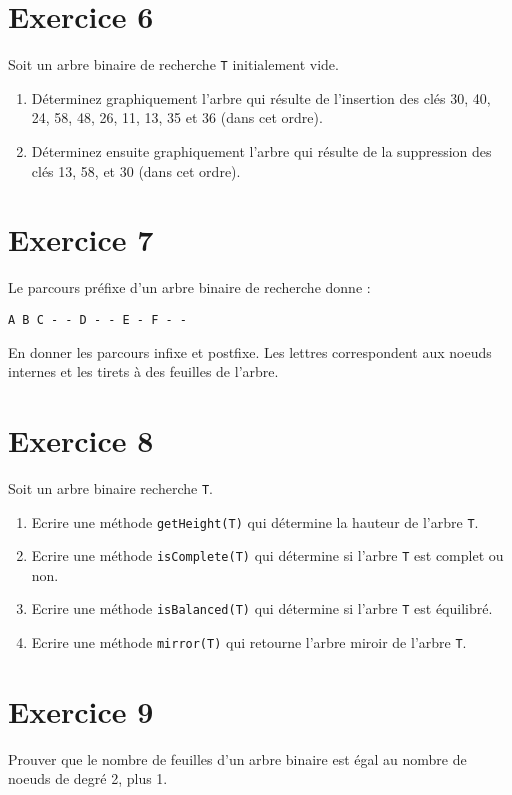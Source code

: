 \documentclass[a4paper,10pt]{article}
\begin{document}
\section*{Exercice 6}

Soit un arbre binaire de recherche \texttt{T} initialement vide.

\begin{enumerate}

\item Déterminez graphiquement l'arbre qui résulte de l'insertion des clés 30, 40, 24, 58, 48, 26, 11, 13, 35 et 36 (dans cet ordre).

\item Déterminez ensuite graphiquement l'arbre qui résulte de la suppression des clés 13, 58, et 30 (dans cet ordre).

\end{enumerate}

\section*{Exercice 7}

Le parcours préfixe d'un arbre binaire de recherche donne :
\begin{verbatim}
A B C - - D - - E - F - -
\end{verbatim}

En donner les parcours infixe et postfixe. Les lettres correspondent aux
noeuds internes et les tirets à des feuilles de l'arbre.

\section*{Exercice 8}

Soit un arbre binaire recherche \texttt{T}.

\begin{enumerate}

\item Ecrire une méthode \texttt{getHeight(T)} qui détermine la hauteur de l'arbre \texttt{T}.

\item Ecrire une méthode \texttt{isComplete(T)} qui détermine si l'arbre \texttt{T} est complet ou non.

\item Ecrire une méthode \texttt{isBalanced(T)} qui détermine si l'arbre \texttt{T} est équilibré.

\item Ecrire une méthode \texttt{mirror(T)} qui retourne l'arbre miroir de l'arbre \texttt{T}.

\end{enumerate}

\section*{Exercice 9}

Prouver que le nombre de feuilles d'un arbre binaire est égal au nombre de noeuds de degré 2, plus 1.
\end{document}
